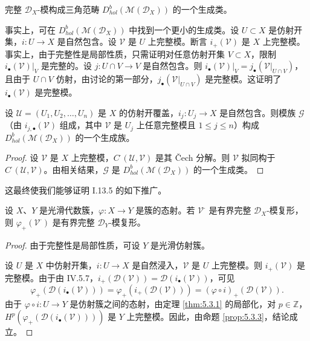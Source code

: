 \begin{proposition}\label{prop:5.3.2}
完整 $\mathcal{D}_X$-模构成三角范畴 $D^b_{hol}(\mathcal{M}(\mathcal{D}_X))$ 的一个生成类。
\end{proposition}

事实上，可在 $D^b_{hol}(\mathcal{M}(\mathcal{D}_X))$ 中找到一个更小的生成类。设 $U\subset X$ 是仿射开集，$i:U\to X$ 是自然包含。设 $\mathcal{V}$ 是 $U$ 上完整模。断言 $i_+(\mathcal{V})$ 是 $X$ 上完整模。事实上，由于完整性是局部性质，只需证明对任意仿射开集 $V\subset X$，限制 $i_\bullet(\mathcal{V})|_V$ 是完整的。设 $j:U\cap V\to V$ 是自然包含。则
$i_\bullet(\mathcal{V})|_V=j_\bullet(\mathcal{V}|_{U\cap V})$，且由于 $U\cap V$ 仿射，由讨论的第一部分，$j_\bullet(\mathcal{V}|_{U\cap V})$ 是完整模。这证明了 $i_\bullet(\mathcal{V})$ 是完整模。

\begin{proposition}\label{prop:5.3.3}
设 $\mathcal{U}=(U_1,U_2,\dots,U_n)$ 是 $X$ 的仿射开覆盖，$i_j:U_j\to X$ 是自然包含。则模族 $\mathcal{G}$（由 $i_{j,\bullet}(\mathcal{V})$ 组成，其中 $\mathcal{V}$ 是 $U_j$ 上任意完整模且 $1\le j\le n$）构成
$D^b_{hol}(\mathcal{M}(\mathcal{D}_X))$ 的一个生成族。
\end{proposition}

\begin{proof}
设 $\mathcal{V}$ 是 $X$ 上完整模，$C^\cdot(\mathcal{U},\mathcal{V})$ 是其 Čech 分解。则 $\mathcal{V}$ 拟同构于
$C^\cdot(\mathcal{U},\mathcal{V})$。由相关结果，$\mathcal{G}$ 是 $D^b_{hol}(\mathcal{M}(\mathcal{D}_X))$ 的一个生成类。
\end{proof}

这最终使我们能够证明 I.13.5 的如下推广。

\begin{theorem}\label{thm:5.3.4}
设 $X$、$Y$ 是光滑代数簇，$\varphi:X\to Y$ 是簇的态射。若 $\mathcal{V}^\cdot$ 是有界完整 $\mathcal{D}_X$-模复形，则
$\varphi_+(\mathcal{V}^\cdot)$ 是有界完整 $\mathcal{D}_Y$-模复形。
\end{theorem}

\begin{proof}
由于完整性是局部性质，可设 $Y$ 是光滑仿射簇。

设 $U$ 是 $X$ 中仿射开集，$i:U\to X$ 是自然浸入，$\mathcal{V}$ 是 $U$ 上完整模。则 $i_+(\mathcal{V})$ 是完整模。由于由 IV.5.7，$i_+(\mathcal{D}(\mathcal{V}))=\mathcal{D}(i_\bullet(\mathcal{V}))$，可见
$$\varphi_+(\mathcal{D}(i_\bullet(\mathcal{V})))=\varphi_+(i_+(\mathcal{D}(\mathcal{V})))
=(\varphi\circ i)_+(\mathcal{D}(\mathcal{V})).$$
由于 $\varphi\circ i:U\to Y$ 是仿射簇之间的态射，由定理 \ref{thm:5.3.1} 的局部化，对 $p\in\mathbb{Z}$，
$H^p(\varphi_+(\mathcal{D}(i_\bullet(\mathcal{V}))))$ 是 $Y$ 上完整模。因此，由命题 \ref{prop:5.3.3}，结论成立。
\end{proof}

